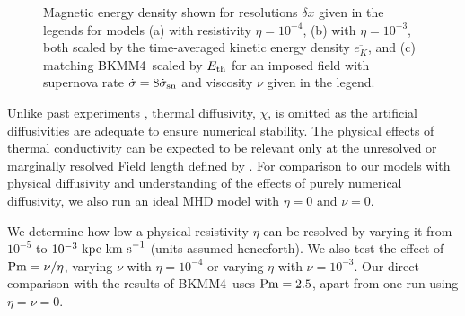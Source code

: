 \documentclass[preprint2]{aastex63}
\newcommand\Pm{{\rm Pm} }
\newcommand\SNr{\dot\sigma_{\rm sn}}
\newcommand\EST{E_{\rm th}}
\newcommand\kpc{~ {\rm kpc}}
\newcommand\dx{ {\delta x}}
\newcommand\kms{~ {\rm km~ s}^{-1}}
\newcommand\BKM{{\sf BKMM4}}
\newcommand{\fg}[1]{\textcolor{midgreen}{#1}}
\newcommand{\mm}[1]{\textcolor{mypurple}{#1}}
\begin{document}
\begin{figure}
\caption{
 Magnetic energy density \mm{shown for resolutions $\dx$ %
   given in the legends for models (a) with resistivity
   $\eta=10^{-4}$, (b) with $\eta=10^{-3}$, both scaled by the} 
 time-averaged kinetic energy density $\overline{e_K}$,
 \fg{and (c) matching \BKM\, scaled by $\EST$ for an imposed field with
   \mm{supernova rate} $\dot\sigma=8\SNr$
   \mm{and viscosity $\nu$ 
    given in the legend.} }
\label{fig:eb-res}}
\end{figure}

 \fg{Unlike past} experiments \citep{Gent:2013b,Gent:2013a,GMKSH20},
 thermal diffusivity, $\chi$, \fg{is omitted as} the artificial diffusivities
 are adequate to ensure numerical stability.
 \fg{The} physical effects of thermal
 conductivity can be expected to be relevant only at the unresolved or
 marginally resolved Field length defined by \citet[][named after George
 Field, not the magnetic field]{BM90}.
 \mm{For comparison to our models with physical diffusivity and
   understanding of the effects of purely numerical diffusivity, we
   also run an ideal MHD model with}
 $\eta=0$ \fg{and $\nu=0$.}

 We determine how low a physical resistivity $\eta$ can be resolved by varying
 it from $10^{-5}$ to $10^{-3}\kpc\kms$ (units assumed henceforth).
 \fg{We also test the effect of $\Pm=\nu/\eta$, varying $\nu$ with 
 $\eta=10^{-4}$ or varying $\eta$ with $\nu=10^{-3}$.}
 \fg{Our direct comparison with the results of \BKM\ uses $\Pm=2.5$, apart
 from one run using $\eta=\nu=0$.}
 
\end{document}
